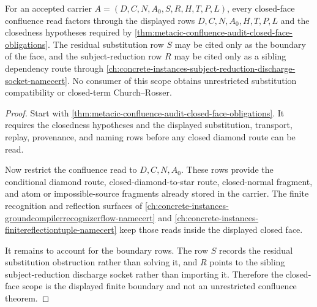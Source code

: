 \begin{theorem}
\label{thm:metacic-confluence-audit-closed-face-scope}
For an accepted carrier $A=(D,C,N,A_0,S,R,H,T,P,L)$, every closed-face
confluence read factors through the displayed rows $D,C,N,A_0,H,T,P,L$ and the
closedness hypotheses required by
\autoref{thm:metacic-confluence-audit-closed-face-obligations}. The residual
substitution row $S$ may be cited only as the boundary of the face, and the
subject-reduction row $R$ may be cited only as a sibling dependency route
through \autoref{ch:concrete-instances-subject-reduction-discharge-socket-namecert}.
No consumer of this scope obtains unrestricted substitution compatibility or
closed-term Church--Rosser.
\end{theorem}
\begin{proof}
Start with \autoref{thm:metacic-confluence-audit-closed-face-obligations}. It
requires the closedness hypotheses and the displayed substitution, transport,
replay, provenance, and naming rows before any closed diamond route can be
read.

Now restrict the confluence read to $D,C,N,A_0$. These rows provide the
conditional diamond route, closed-diamond-to-star route, closed-normal
fragment, and atom or impossible-source fragments already stored in the
carrier. The finite recognition and reflection surfaces of
\autoref{ch:concrete-instances-groundcompilerrecognizerflow-namecert} and
\autoref{ch:concrete-instances-finitereflectiontuple-namecert} keep those
reads inside the displayed closed face.

It remains to account for the boundary rows. The row $S$ records the residual
substitution obstruction rather than solving it, and $R$ points to the sibling
subject-reduction discharge socket rather than importing it. Therefore the
closed-face scope is the displayed finite boundary and not an unrestricted
confluence theorem.
\end{proof}

